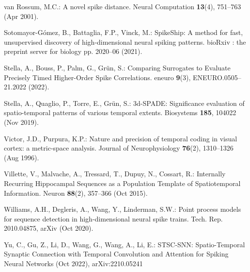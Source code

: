 \documentclass[runningheads]{llncs}
\begin{document}
\begin{thebibliography}{10}
  van Rossum, M.C.: A novel spike distance. Neural Computation  \textbf{13}(4),  751--763 (Apr 2001). %
  
  Sotomayor-Gómez, B., Battaglia, F.P., Vinck, M.: {SpikeShip}: {A} method for fast, unsupervised discovery of high-dimensional neural spiking patterns. bioRxiv : the preprint server for biology pp. 2020--06 (2021). %
  
  Stella, A., Bouss, P., Palm, G., Grün, S.: Comparing {Surrogates} to {Evaluate} {Precisely} {Timed} {Higher}-{Order} {Spike} {Correlations}. eneuro  \textbf{9}(3),  ENEURO.0505--21.2022 (2022). %
  
  Stella, A., Quaglio, P., Torre, E., Grün, S.: 3d-{SPADE}: {Significance} evaluation of spatio-temporal patterns of various temporal extents. Biosystems  \textbf{185},  104022 (Nov 2019). %
  
  Victor, J.D., Purpura, K.P.: Nature and precision of temporal coding in visual cortex: a metric-space analysis. Journal of Neurophysiology  \textbf{76}(2),  1310--1326 (Aug 1996). %
  
  Villette, V., Malvache, A., Tressard, T., Dupuy, N., Cossart, R.: Internally {Recurring} {Hippocampal} {Sequences} as a {Population} {Template} of {Spatiotemporal} {Information}. Neuron  \textbf{88}(2),  357--366 (Oct 2015). %
  
  Williams, A.H., Degleris, A., Wang, Y., Linderman, S.W.: Point process models for sequence detection in high-dimensional neural spike trains. Tech. Rep. 2010.04875, arXiv (Oct 2020). %
  
  Yu, C., Gu, Z., Li, D., Wang, G., Wang, A., Li, E.: {STSC}-{SNN}: {Spatio}-{Temporal} {Synaptic} {Connection} with {Temporal} {Convolution} and {Attention} for {Spiking} {Neural} {Networks} (Oct 2022), arXiv:2210.05241 %
  
  \end{thebibliography}
  
\end{document}
